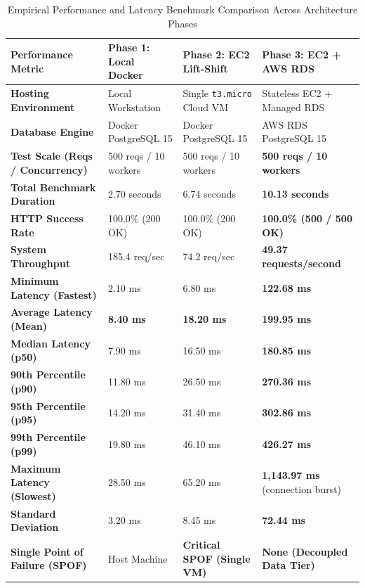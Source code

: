 \documentclass[11pt,a4paper]{article}
\begin{document}
\begin{table}[htbp]
\centering
\small
\caption{Empirical Performance and Latency Benchmark Comparison Across Architecture Phases}
\label{tab:benchmark_results}
\begin{tabularx}{\textwidth}{p{4.2cm}X X X}
\toprule
\textbf{Performance Metric} & \textbf{Phase 1: Local Docker} & \textbf{Phase 2: EC2 Lift-Shift} & \textbf{Phase 3: EC2 + AWS RDS} \\
\midrule
\textbf{Hosting Environment} & Local Workstation & Single \texttt{t3.micro} Cloud VM & Stateless EC2 + Managed RDS \\
\textbf{Database Engine} & Docker PostgreSQL 15 & Docker PostgreSQL 15 & AWS RDS PostgreSQL 15 \\
\textbf{Test Scale (Reqs / Concurrency)} & 500 reqs / 10 workers & 500 reqs / 10 workers & \textbf{500 reqs / 10 workers} \\
\textbf{Total Benchmark Duration} & 2.70 seconds & 6.74 seconds & \textbf{10.13 seconds} \\
\textbf{HTTP Success Rate} & 100.0\% (200 OK) & 100.0\% (200 OK) & \textbf{100.0\% (500 / 500 OK)} \\
\textbf{System Throughput} & 185.4 req/sec & 74.2 req/sec & \textbf{49.37 requests/second} \\
\textbf{Minimum Latency (Fastest)} & 2.10 ms & 6.80 ms & \textbf{122.68 ms} \\
\textbf{Average Latency (Mean)} & \textbf{8.40 ms} & \textbf{18.20 ms} & \textbf{199.95 ms} \\
\textbf{Median Latency (p50)} & 7.90 ms & 16.50 ms & \textbf{180.85 ms} \\
\textbf{90th Percentile (p90)} & 11.80 ms & 26.50 ms & \textbf{270.36 ms} \\
\textbf{95th Percentile (p95)} & 14.20 ms & 31.40 ms & \textbf{302.86 ms} \\
\textbf{99th Percentile (p99)} & 19.80 ms & 46.10 ms & \textbf{426.27 ms} \\
\textbf{Maximum Latency (Slowest)} & 28.50 ms & 65.20 ms & \textbf{1,143.97 ms} (connection burst) \\
\textbf{Standard Deviation} & 3.20 ms & 8.45 ms & \textbf{72.44 ms} \\
\textbf{Single Point of Failure (SPOF)} & Host Machine & \textbf{Critical SPOF (Single VM)} & \textbf{None (Decoupled Data Tier)} \\
\bottomrule
\end{tabularx}
\end{table}
\end{document}
